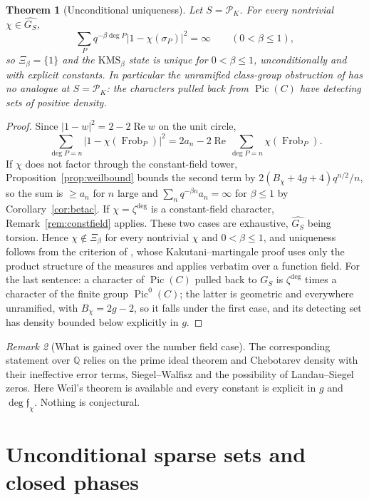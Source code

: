 \documentclass[11pt]{amsart}
\numberwithin{equation}{section}
\newtheorem{theorem}{Theorem}[section]
\theoremstyle{definition}
\theoremstyle{remark}
\newtheorem{remark}[theorem]{Remark}
\newcommand{\Q}{\mathbb{Q}}
\newcommand{\cP}{\mathcal{P}}
\newcommand{\ff}{\mathfrak{f}}
\newcommand{\Frob}{\operatorname{Frob}}
\begin{document}
\begin{theorem}[Unconditional uniqueness]\label{thm:uniqueness}
Let $S=\cP_K$. For every nontrivial $\chi\in\widehat{G_S}$,
\[
\sum_{P}q^{-\beta\deg P}\bigl|1-\chi(\sigma_P)\bigr|^2=\infty\qquad(0<\beta\le1),
\]
so $\Xi_\beta=\{1\}$ and the $\mathrm{KMS}_\beta$ state is unique for $0<\beta\le1$,
unconditionally and with explicit constants. In particular the unramified class-group
obstruction of \cite[\S4.1]{Main} has no analogue at $S=\cP_K$: the characters pulled back
from $\operatorname{Pic}(C)$ have detecting sets of positive density.
\end{theorem}

\begin{proof}
Since $|1-w|^2=2-2\operatorname{Re}w$ on the unit circle,
\[
\sum_{\deg P=n}\bigl|1-\chi(\Frob_P)\bigr|^2
=2a_n-2\operatorname{Re}\sum_{\deg P=n}\chi(\Frob_P).
\]
If $\chi$ does not factor through the
constant-field tower, Proposition~\ref{prop:weilbound} bounds the second term by
$2(B_\chi+4g+4)q^{n/2}/n$, so the sum is $\ge a_n$ for $n$ large and
$\sum_nq^{-\beta n}a_n=\infty$ for $\beta\le1$ by Corollary~\ref{cor:betac}. If
$\chi=\zeta^{\deg}$ is a constant-field character, Remark~\ref{rem:constfield} applies.
These two cases are exhaustive, $\widehat{G_S}$ being torsion. Hence $\chi\notin\Xi_\beta$
for every nontrivial $\chi$ and $0<\beta\le1$, and uniqueness follows from the criterion of
\cite[Thm.~3.9]{Main}, whose Kakutani--martingale proof uses only the product structure of
the measures and applies verbatim over a function field. For the last sentence: a character
of $\operatorname{Pic}(C)$ pulled back to $G_S$ is $\zeta^{\deg}$ times a character of the
finite group $\operatorname{Pic}^0(C)$; the latter is geometric and everywhere unramified,
with $B_\chi=2g-2$, so it falls under the first case, and its detecting set has density
bounded below explicitly in $g$.
\end{proof}

\begin{remark}[What is gained over the number field case]\label{rem:gain}
The corresponding statement over $\Q$ \cite[Thm.~3.9]{Main} relies on the prime ideal theorem
and Chebotarev density with their ineffective error terms, Siegel--Walfisz and the possibility
of Landau--Siegel zeros. Here Weil's theorem is available and every constant is explicit in
$g$ and $\deg\ff_\chi$. Nothing is conjectural.
\end{remark}

\section{Unconditional sparse sets and closed phases}
\end{document}
